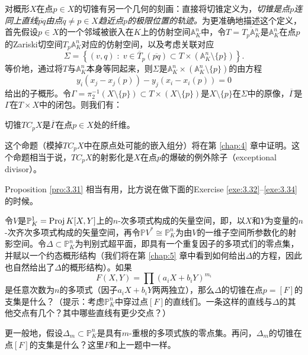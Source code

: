 对概形$X$在点$p\in X$的切锥有另一个几何的刻画：直接将切锥定义为，\textit{切锥是点$p$连同上直线$\overline{pq}$由点$q\neq p\in X$趋近点$p$的极限位置的轨迹。}为更准确地描述这个定义，首先假设$p\in X$的一个邻域被嵌入在$K$上的仿射空间$\mathbb A_K^n$中，令$T=\overline{T_p\mathbb A_K^n}$是$\mathbb A_K^n$在点$p$的Zariski切空间$T_p\mathbb A_K^n$对应的仿射空间，以及考虑关联对应
\[
	\Sigma = \left\{(v,q)\;:\;v\in \overline{T}_p(\overline{pq})\subset T\times (\mathbb A_K^n \setminus \{p\})\right\}.
\] %
等价地，通过将$T$与$\mathbb A_K^n$本身等同起来，则$\Sigma$是$\mathbb A_K^n\times (\mathbb A_K^n \setminus \{p\})$的由方程
\[
	y_i\left(x_j-x_j(p)\right)-y_j\left(x_i-x_i(p)\right)=0
\]
给出的子概形。令$\Gamma=\pi_2^{-1}(X\setminus \{p\})\subset T\times (X\setminus \{p\})$是$X\setminus \{p\}$在$\Sigma$中的原像，$\overline{\Gamma}$是$\Gamma$在$T\times X$中的闭包。则我们有：

\begin{pro}\label{pro:3.31}
切锥$TC_p X$是$\overline{\Gamma}$在点$p\in X$处的纤维。
\end{pro}

这个命题（模掉$TC_p X$中在原点处可能的嵌入组分）将在第 \ref{chap:4} 章中证明。这个命题相当于说，$TC_p X$的射影化是$X$在点$p$的爆破的例外除子（exceptional divisor）。

Proposition \ref{pro:3.31} 相当有用，比方说在做下面的Exercise \ref{exe:3.32}--\ref{exe:3.34} 的时候。

\begin{exe}\label{exe:3.32}
令$V$是$\mathbb P_K^1=\operatorname{Proj} K[X,Y]$上的$n$-次多项式构成的矢量空间，即，以$X$和$Y$为变量的$n$-次齐次多项式构成的矢量空间，再令$\mathbb P V^*\cong \mathbb P_K^n$为由$V$的一维子空间所参数化的射影空间。令$\Delta\subset \mathbb P_K^n$为判别式超平面，即具有一个重复因子的多项式们的零点集，并赋以一个约态概形结构（我们将在第 \ref{chap:5} 章中看到如何给出$\Delta$的方程，因此也自然给出了$\Delta$的概形结构）。如果
\[
	F(X,Y)=\prod (a_i X+b_i Y)^{m_i}
\]
是任意次数为$n$的多项式（因子$a_iX+b_iY$两两独立），那么$\Delta$的切锥在点$p=[F]$的支集是什么？（提示：考虑$\mathbb P_K^n$中穿过点$[F]$的直线们。一条这样的直线与$\Delta$的其他交点有几个？其中哪些直线有更少交点？）
\end{exe}

\begin{exe}\label{exe:3.33}
更一般地，假设$\Delta_m\subset \mathbb P_K^n$是具有$m$-重根的多项式族的零点集。再问，$\Delta_m$的切锥在点$[F]$的支集是什么？这里$F$和上一题中一样。
\end{exe}

